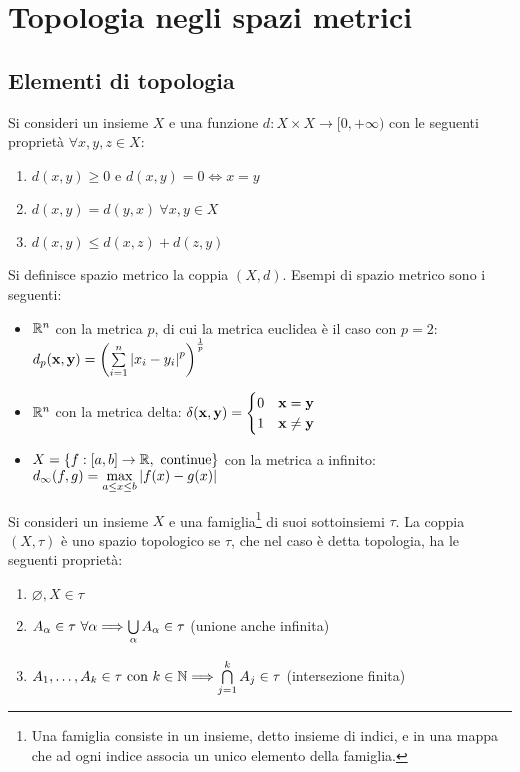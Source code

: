 \chapter{Topologia negli spazi metrici}\label{chap:topology}

\section{Elementi di topologia}

\begin{definition}\label{def:distance}
    Si consideri un insieme $X$ e una funzione $d: X\times X \to [0, +\infty)$ con le seguenti proprietà $\forall x,y,z \in X$:
    \begin{enumerate}
        \item $d(x,y) \geq 0$ e $d(x,y)=0 \iff  x = y$
        \item $d(x,y) = d(y,x) \  \forall x, y \in X$
        \item $d(x,y) \leq d(x,z) + d(z,y)$
    \end{enumerate}
    Si definisce spazio metrico la coppia $(X, d)$. Esempi di spazio metrico sono i seguenti:
    \begin{itemize}
        \item $\mathbb{R}^n$ con la metrica $p$, di cui la metrica euclidea è il caso con $p=2$: $d_p(\vb{x},\vb{y})=\left(\sum\limits_{i=1}^n \abs{x_i-y_i}^p\right)^{\frac{1}{p}}$
        \item $\mathbb{R}^n$ con la metrica delta: $\delta(\vb{x},\vb{y})=\begin{cases}
            0 &\vb{x}=\vb{y}\\
            1 &\vb{x}\neq\vb{y}
        \end{cases}$
        \item $X=\{f:[a,b]\to\mathbb{R}, \text{ continue}\}$ con la metrica a infinito: $d_\infty(f,g)=\max\limits_{a\leq x\leq b}\abs{f(x)-g(x)}$
    \end{itemize}
\end{definition}

\begin{definition}[Topologia]
    Si consideri un insieme $X$ e una famiglia\footnote{Una famiglia consiste in un insieme, detto insieme di indici, e in una mappa che ad ogni indice associa un unico elemento della famiglia.} di suoi sottoinsiemi $\tau$. La coppia $(X, \tau)$ è uno spazio topologico se $\tau$, che nel caso è detta topologia, ha le seguenti proprietà:
    \begin{enumerate}
        \item $\varnothing, X \in \tau$
        \item $A_{\alpha} \in \tau \ \forall \alpha \Longrightarrow \bigcup\limits_\alpha A_\alpha \in \tau$ (unione anche infinita)
        \item $A_1,\dots,A_k \in \tau \text{ con } k \in \mathbb{N} \Longrightarrow \bigcap\limits_{j=1}^k A_j \in \tau$ (intersezione finita)
    \end{enumerate}
\end{definition}

